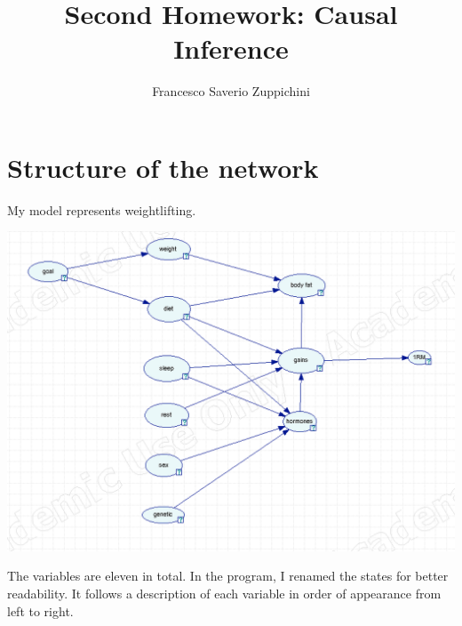\documentclass[11pt]{article}
\title{Second Homework: Causal Inference}
\author{Francesco Saverio Zuppichini}
\begin{document}
\maketitle
\section{Structure of the network}
My model represents weightlifting.  

\includegraphics[width=\textwidth]{./images/net.png}

The variables are eleven in total. In the program, I renamed the states
for better readability. It follows a description of each variable
in order of appearance from left to right.
\end{document}
